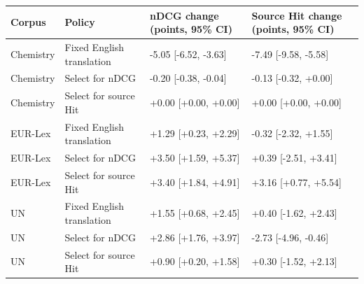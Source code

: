 \begin{tabular}{llll}
\toprule
Corpus & Policy & nDCG change (points, 95\% CI) & Source Hit change (points, 95\% CI) \\
\midrule
Chemistry & Fixed English translation & -5.05 [-6.52, -3.63] & -7.49 [-9.58, -5.58] \\
Chemistry & Select for nDCG & -0.20 [-0.38, -0.04] & -0.13 [-0.32, +0.00] \\
Chemistry & Select for source Hit & +0.00 [+0.00, +0.00] & +0.00 [+0.00, +0.00] \\
EUR-Lex & Fixed English translation & +1.29 [+0.23, +2.29] & -0.32 [-2.32, +1.55] \\
EUR-Lex & Select for nDCG & +3.50 [+1.59, +5.37] & +0.39 [-2.51, +3.41] \\
EUR-Lex & Select for source Hit & +3.40 [+1.84, +4.91] & +3.16 [+0.77, +5.54] \\
UN & Fixed English translation & +1.55 [+0.68, +2.45] & +0.40 [-1.62, +2.43] \\
UN & Select for nDCG & +2.86 [+1.76, +3.97] & -2.73 [-4.96, -0.46] \\
UN & Select for source Hit & +0.90 [+0.20, +1.58] & +0.30 [-1.52, +2.13] \\
\bottomrule
\end{tabular}
